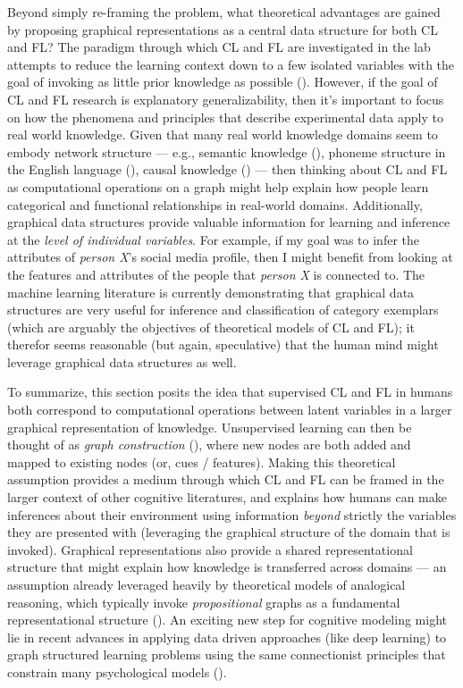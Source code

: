 \documentclass[12pt]{article}
\let\oldcite=\cite
\renewcommand{\cite}[1]{\textcolor[rgb]{0, .121, .388}{\oldcite{#1}}}
\begin{document}
Beyond simply re-framing the problem, what theoretical advantages are gained by proposing graphical representations as a central data structure for both CL and FL? The paradigm through which CL and FL are investigated in the lab attempts to reduce the learning context down to a few isolated variables with the goal of invoking as little prior knowledge as possible (\cite{kurtz2015human}). However, if the goal of CL and FL research is explanatory generalizability, then it's important to focus on how the phenomena and principles that describe experimental data apply to real world knowledge. Given that many real world knowledge domains seem to embody network structure --- e.g., semantic knowledge (\cite{collins1969retrieval,steyvers2005large}), phoneme structure in the English language (\cite{vitevitch2008can}), causal knowledge (\cite{danks2014unifying}) --- then thinking about CL and FL as computational operations on a graph might help explain how people learn categorical and functional relationships in real-world domains. Additionally, graphical data structures provide valuable information for learning and inference at the \emph{level of individual variables}. For example, if my goal was to infer the attributes of \emph{person X}'s social media profile, then I might benefit from looking at the features and attributes of the people that \emph{person X} is connected to. The machine learning literature is currently demonstrating that graphical data structures are very useful for inference and classification of category exemplars (which are arguably the objectives of theoretical models of CL and FL); it therefor seems reasonable (but again, speculative) that the human mind might leverage graphical data structures as well.

To summarize, this section posits the idea that supervised CL and FL in humans both correspond to computational operations between latent variables in a larger graphical representation of knowledge. Unsupervised learning can then be thought of as \emph{graph construction} (\cite{wu2020comprehensive}), where new nodes are both added and mapped to existing nodes (or, cues / features). Making this theoretical assumption provides a medium through which CL and FL can be framed in the larger context of other cognitive literatures, and explains how humans can make inferences about their environment using information \emph{beyond} strictly the variables they are presented with (leveraging the graphical structure of the domain that is invoked). Graphical representations also provide a shared representational structure that might explain how knowledge is transferred across domains --- an assumption already leveraged heavily by theoretical models of analogical reasoning, which typically invoke \emph{propositional} graphs as a fundamental representational structure (\cite{gentner1983structure,hummel1996lisa}). An exciting new step for cognitive modeling might lie in recent advances in applying data driven approaches (like deep learning) to graph structured learning problems using the same connectionist principles that constrain many psychological models (\cite{wu2020comprehensive,schlichtkrull2018modeling}).
\end{document}

